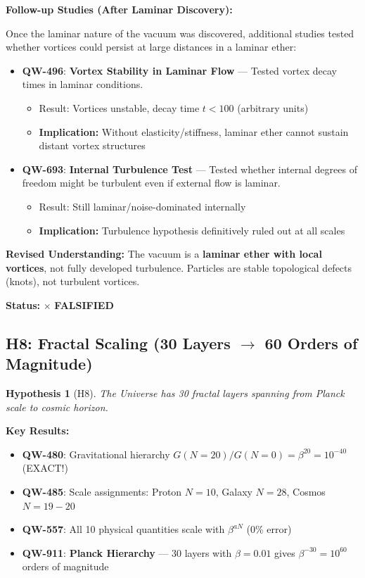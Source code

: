 \documentclass[11pt,a4paper]{book}
\newtheorem{hypothesis}{Hypothesis}[section]
\theoremstyle{remark}
\newcommand{\QW}[1]{\textbf{QW-#1}}
\begin{document}
\textbf{Follow-up Studies (After Laminar Discovery):}

Once the laminar nature of the vacuum was discovered, additional studies tested whether vortices could persist at large distances in a laminar ether:

\begin{itemize}
    \item \QW{496}: \textbf{Vortex Stability in Laminar Flow} --- Tested vortex decay times in laminar conditions.
    \begin{itemize}
        \item Result: Vortices unstable, decay time $t < 100$ (arbitrary units)
        \item \textbf{Implication:} Without elasticity/stiffness, laminar ether cannot sustain distant vortex structures
    \end{itemize}
    
    \item \QW{693}: \textbf{Internal Turbulence Test} --- Tested whether internal degrees of freedom might be turbulent even if external flow is laminar.
    \begin{itemize}
        \item Result: Still laminar/noise-dominated internally
        \item \textbf{Implication:} Turbulence hypothesis definitively ruled out at all scales
    \end{itemize}
\end{itemize}

\textbf{Revised Understanding:}
The vacuum is a \textbf{laminar ether with local vortices}, not fully developed turbulence. Particles are stable topological defects (knots), not turbulent vortices.

\textbf{Status:} $\times$ \textbf{FALSIFIED}

\subsection{H8: Fractal Scaling (30 Layers $\to$ 60 Orders of Magnitude)}

\begin{hypothesis}[H8]
The Universe has 30 fractal layers spanning from Planck scale to cosmic horizon.
\end{hypothesis}

\textbf{Key Results:}
\begin{itemize}
    \item \QW{480}: Gravitational hierarchy $G(N=20)/G(N=0) = \beta^{20} = 10^{-40}$ (EXACT!)
    \item \QW{485}: Scale assignments: Proton $N=10$, Galaxy $N=28$, Cosmos $N=19-20$
    \item \QW{557}: All 10 physical quantities scale with $\beta^{aN}$ (0\% error)
    \item \QW{911}: \textbf{Planck Hierarchy} --- 30 layers with $\beta = 0.01$ gives $\beta^{-30} = 10^{60}$ orders of magnitude
\end{itemize}
\end{document}
